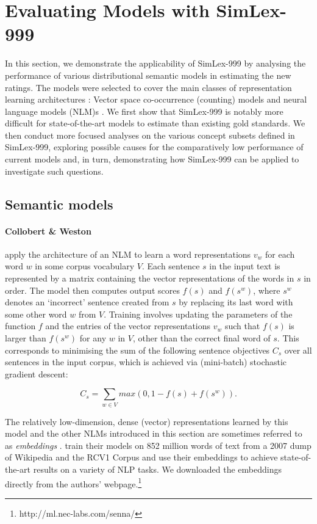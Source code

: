 \section{Evaluating Models with SimLex-999}

In this section, we demonstrate the applicability of SimLex-999 by analysing the performance of various distributional semantic models in estimating the new ratings. The models were selected to cover the main classes of representation learning architectures \cite{baroni2014don}: Vector space co-occurrence (counting) models and neural language models (NLM)s \cite{Bengio2003lm}. We first show that SimLex-999 is notably more difficult for state-of-the-art models to estimate than existing gold standards. We then conduct more focused analyses on the various concept subsets defined in SimLex-999, exploring possible causes for the comparatively low performance of current models and, in turn, demonstrating how SimLex-999 can be applied to investigate such questions.    

\subsection{Semantic models}

\paragraph{\bf Collobert \& Weston}

\cite{collobert2008unified} apply the architecture of an NLM to learn a word representations \(v_w\) for each word \(w\) in some corpus vocabulary \( V\). Each sentence \( s\) in the input text is represented by a matrix containing the vector representations of the words in \(s\) in order. The model then computes output scores \(f(s) \) and \(f(s^w) \), where \(s^w\) denotes an `incorrect' sentence created from \(s\) by replacing its last word with some other word \( w\) from \(V\). Training involves updating the parameters of the function \(f\) and the entries of the vector representations \(v_w\) such that  \(f(s)\) is larger than \(f(s^w) \) for any \(w\) in \(V\), other than the correct final word of \(s\). This corresponds to minimising the sum of the following sentence objectives \( C_s\) over all sentences in the input corpus, which is achieved via (mini-batch) stochastic gradient descent:

\[ C_{s}  = \sum_{w \in V} max(0,1-f(s) + f(s^w)). \]

The relatively low-dimension, dense (vector) representations learned by this model and the other NLMs introduced in this section are sometimes referred to as \emph{embeddings} \cite{turian2010word}. \cite{collobert2008unified} train their models on 852 million words of text from a 2007 dump of Wikipedia and the RCV1 Corpus \cite{lewis2004rcv1} and use their embeddings to achieve state-of-the-art results on a variety of NLP tasks. We downloaded the embeddings directly from the authors' webpage.\footnote{http://ml.nec-labs.com/senna/}

